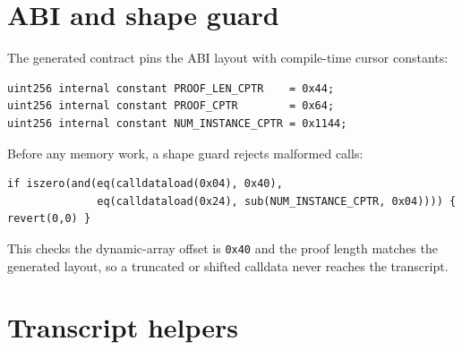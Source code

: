 \section{ABI and shape guard}
\label{sec:abi}

The generated contract pins the ABI layout with compile-time cursor
constants:
\begin{lstlisting}[style=yul]
uint256 internal constant PROOF_LEN_CPTR    = 0x44;
uint256 internal constant PROOF_CPTR        = 0x64;
uint256 internal constant NUM_INSTANCE_CPTR = 0x1144;
\end{lstlisting}
Before any memory work, a shape guard rejects malformed calls:
\begin{lstlisting}[style=yul]
if iszero(and(eq(calldataload(0x04), 0x40),
              eq(calldataload(0x24), sub(NUM_INSTANCE_CPTR, 0x04)))) { revert(0,0) }
\end{lstlisting}
This checks the dynamic-array offset is \texttt{0x40} and the proof length
matches the generated layout, so a truncated or shifted calldata never
reaches the transcript.

\section{Transcript helpers}
\label{sec:sol-transcript}

